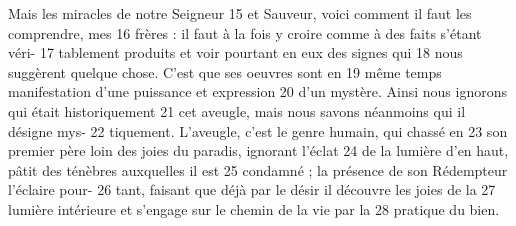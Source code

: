 Mais les miracles de notre Seigneur	 
15	 	et Sauveur, voici comment il faut les comprendre, mes	 
16	 	frères : il faut à la fois y croire comme à des faits s'étant véri-	 
17	 	tablement produits et voir pourtant en eux des signes qui	 
18	 	nous suggèrent quelque chose. C'est que ses oeuvres sont en	 
19	 	même temps manifestation d'une puissance et expression	 
20	 	d'un mystère. Ainsi nous ignorons qui était historiquement	 
21	 	cet aveugle, mais nous savons néanmoins qui il désigne mys-	 
22	 	tiquement. L'aveugle, c'est le genre humain, qui chassé en	 
23	 	son premier père loin des joies du paradis, ignorant l'éclat	 
24	 	de la lumière d'en haut, pâtit des ténèbres auxquelles il est	 
25	 	condamné ; la présence de son Rédempteur l'éclaire pour-	 
26	 	tant, faisant que déjà par le désir il découvre les joies de la	 
27	 	lumière intérieure et s'engage sur le chemin de la vie par la	 
28	 	pratique du bien.